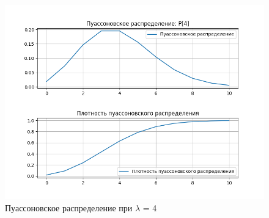 \clearpage

\begin{figure}[ht!]
	\centering
	\includegraphics[width=1.0\linewidth]{img/poisson3.png}
	\caption{Пуассоновское распределение при $\lambda$ = 4}
	\label{ex:n3}
\end{figure}